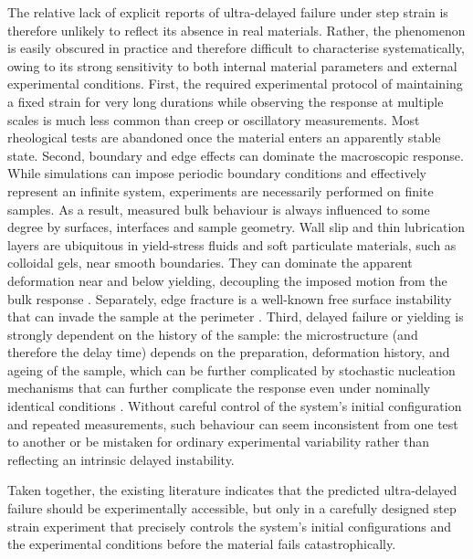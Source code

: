 \documentclass[asymmetricmargins]{library/duthesis}%
\begin{document}
The relative lack of explicit reports of ultra-delayed failure under step strain is therefore unlikely to reflect its absence in real materials. Rather, the phenomenon is easily obscured in practice and therefore difficult to characterise systematically, owing to its strong sensitivity to both internal material parameters and external experimental conditions. First, the required experimental protocol of maintaining a fixed strain for very long durations while observing the response at multiple scales is much less common than creep or oscillatory measurements. Most rheological tests are abandoned once the material enters an apparently stable state. Second, boundary and edge effects can dominate the macroscopic response. While simulations can impose periodic boundary conditions and effectively represent an infinite system, experiments are necessarily performed on finite samples. As a result, measured bulk behaviour is always influenced to some degree by surfaces, interfaces and sample geometry. Wall slip and thin lubrication layers are ubiquitous in yield-stress fluids and soft particulate materials, such as colloidal gels, near smooth boundaries. They can dominate the apparent deformation near and below yielding, decoupling the imposed motion from the bulk response \cite{Divoux2024,Walls2003,Ballesta2013,Jung2021}. Separately, edge fracture is a well-known free surface instability that can invade the sample at the perimeter \cite{ElastomersEdge2024,Hemingway2017}. Third, delayed failure or yielding is strongly dependent on the history of the sample: the microstructure (and therefore the delay time) depends on the preparation, deformation history, and ageing of the sample, which can be further complicated by stochastic nucleation mechanisms that can further complicate the response even under nominally identical conditions \cite{blindstrom_structures_2012,Divoux2024,bouzidNetworkTopologySoft2018,Cipelletti2000}. Without careful control of the system's initial configuration and repeated measurements, such behaviour can seem inconsistent from one test to another or be mistaken for ordinary experimental variability rather than reflecting an intrinsic delayed instability.

Taken together, the existing literature indicates that the predicted ultra-delayed failure should be experimentally accessible, but only in a carefully designed step strain experiment that precisely controls the system's initial configurations and the experimental conditions before the material fails catastrophically.
\end{document}
